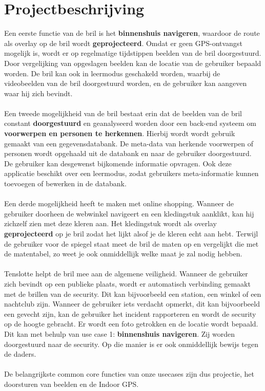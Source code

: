 \documentclass[12pt,a4paper,oneside]{article}
\begin{document}
\section{Projectbeschrijving}
Een eerste functie van de bril is het \textbf{binnenshuis navigeren}, waardoor de route als overlay op de bril wordt \textbf{geprojecteerd}. Omdat er geen GPS-ontvangst mogelijk is, wordt er op regelmatige tijdstippen beelden van de bril doorgestuurd. Door vergelijking van opgeslagen beelden kan de locatie van de gebruiker bepaald worden. De bril kan ook in leermodus geschakeld worden, waarbij de videobeelden van de bril doorgestuurd worden, en de gebruiker kan aangeven waar hij zich bevindt.
\\
\\
Een tweede mogelijkheid van de bril bestaat erin dat de beelden van de bril constant \textbf{doorgestuurd} en geanalyseerd worden door een back-end systeem om \textbf{voorwerpen en personen te herkennen}. Hierbij wordt wordt gebruik gemaakt van een gegevensdatabank. De meta-data van herkende voorwerpen of personen wordt opgehaald uit de databank en naar de gebruiker doorgestuurd. De gebruiker kan desgewenst bijkomende informatie opvragen. Ook deze applicatie beschikt over een leermodus, zodat gebruikers meta-informatie kunnen toevoegen of bewerken in de databank.
\\
\\
Een derde mogelijkheid heeft te maken met online shopping. Wanneer de gebruiker doorheen de webwinkel navigeert en een kledingstuk aanklikt, kan hij zichzelf zien met deze kleren aan. Het kledingstuk wordt als overlay \textbf{geprojecteerd} op je bril zodat het lijkt alsof je de kleren echt aan hebt. Terwijl de gebruiker voor de spiegel staat meet de bril de maten op en vergelijkt die met de matentabel, zo weet je ook onmiddellijk welke maat je zal nodig hebben.
\\
\\
Tenslotte helpt de bril mee aan de algemene veiligheid. Wanneer de gebruiker zich bevindt op een publieke plaats, wordt er automatisch verbinding gemaakt met de brillen van de security. Dit kan bijvoorbeeld een station, een winkel of een nachtclub zijn. Wanneer de gebruiker iets verdacht opmerkt, dit kan bijvoorbeeld een gevecht zijn, kan de gebruiker het incident rapporteren en wordt de security op de hoogte gebracht. Er wordt een foto getrokken en de locatie wordt bepaald. Dit kan met behulp van use case 1: \textbf{binnenshuis navigeren}. Zij worden doorgestuurd naar de security. Op die manier is er ook onmiddellijk bewijs tegen de daders.
\\
\\
De belangrijkste common core functies van onze usecases zijn dus projectie, het doorsturen van beelden en de Indoor GPS.
\newpage
\end{document}

